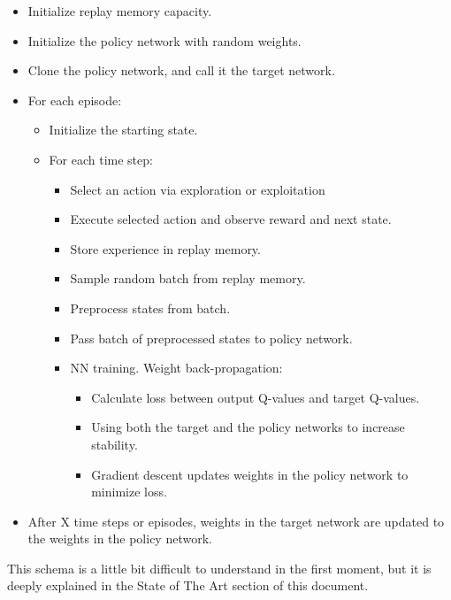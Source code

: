 			\begin{itemize}
				\item[\textendash]Initialize replay memory capacity.
				\item[\textendash]Initialize the policy network with random weights.
				\item[\textendash]Clone the policy network, and call it the target network.
				\item[\textendash]For each episode:
				\begin{itemize}
					\item[\textendash]Initialize the starting state.
					\item[\textendash]For each time step:
					\begin{itemize}
						\item[\textendash]Select an action via exploration or exploitation
						\item[\textendash]Execute selected action and observe reward and next state.
						\item[\textendash]Store experience in replay memory.
						\item[\textendash]Sample random batch from replay memory.
						\item[\textendash]Preprocess states from batch.
						\item[\textendash]Pass batch of preprocessed states to policy network.
						\item[\textendash]NN training. Weight back-propagation:
						\begin{itemize}
							\item[\textendash]Calculate loss between output Q-values and target Q-values.
							\item[\textendash]Using both the target and the policy networks to increase stability.
							\item[\textendash]Gradient descent updates weights in the policy network to minimize loss.
						\end{itemize}
						
					\end{itemize}
				\end{itemize}
				\item[\textendash]After X time steps or episodes, weights in the target network are updated to the weights in the policy network.
			\end{itemize}
		
			This schema is a little bit difficult to understand in the first moment, but it is deeply explained in the State of The Art section of this document.
			
